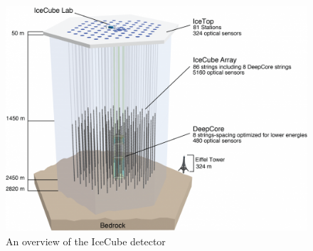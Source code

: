 \begin{figure}
	\centering \includegraphics{figures/icecube/IceCubeArray.png}
	\caption{An overview of the IceCube detector}
	\label{fig:ic_detector}
\end{figure}

